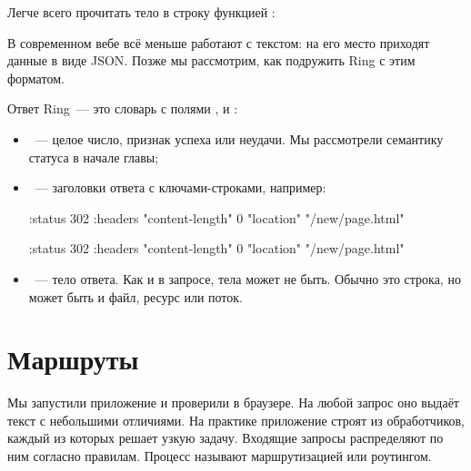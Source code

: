 Легче всего прочитать тело в строку функцией :


В современном вебе всё меньше работают с текстом: на его место приходят данные в
виде JSON. Позже мы рассмотрим, как подружить Ring с этим форматом.


Ответ Ring~--- это словарь с полями ,  и
:

\begin{itemize}

\item
  ~--- целое число, признак успеха или неудачи. Мы рассмотрели
  семантику статуса в начале главы;

\item
  ~--- заголовки ответа с клю\-ча\-ми-стр\-ок\-ами, например:


\ifnarrow

\begin{clojure}
{:status 302
 :headers
   {"content-length" 0
    "location" "/new/page.html"}}
\end{clojure}

\else

\begin{clojure}
{:status 302
 :headers {"content-length" 0
           "location" "/new/page.html"}}
\end{clojure}

\fi

\item
  ~--- тело ответа. Как и в запросе, тела может не быть. Обычно
  это строка, но может быть и файл, ресурс или поток.

\end{itemize}

\section{Маршруты}


Мы запустили приложение и проверили в браузере. На любой запрос оно выдаёт текст
с небольшими отличиями. На практике приложение строят из обработчиков, каждый из
которых решает узкую задачу. Входящие запросы распределяют по ним согласно
правилам. Процесс называют маршрутизацией или роутингом.

